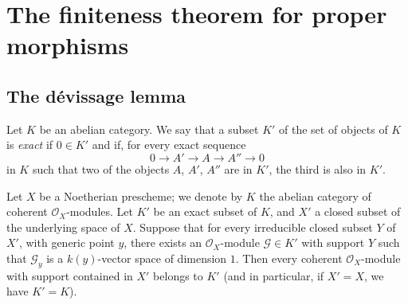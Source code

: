 \section{The finiteness theorem for proper morphisms}
\label{section:III.3}

\subsection{The dévissage lemma}
\label{subsection:III.3.1}

\begin{definition}[3.1.1]
\label{III.3.1.1}
Let $K$ be an abelian category. We say that a subset $K'$ of
the set of objects of $K$ is \emph{exact} if $0\in K'$ and if, for every
exact sequence
\[
0\longrightarrow A'\longrightarrow A\longrightarrow A''\longrightarrow0
\]
in $K$ such that two of the objects $A$, $A'$, $A''$ are in $K'$, the
third is also in $K'$.
\end{definition}

\begin{theorem}[3.1.2]
\label{III.3.1.2}
Let $X$ be a Noetherian prescheme; we denote by $K$ the abelian category
of coherent $\mathcal O_X$-modules. Let $K'$ be an exact subset of
$K$, and $X'$ a closed subset of the underlying space of $X$. Suppose that
for every irreducible closed subset $Y$ of $X'$, with generic point $y$, there
exists an $\mathcal O_X$-module $\mathcal G\in K'$ with support $Y$ such that $\mathcal G_y$ is
a $k(y)$-vector space of dimension $1$. Then every coherent $\mathcal O_X$-module
with support contained in $X'$ belongs to $K'$ (and in particular,
if $X'=X$, we have $K'=K$).
\end{theorem}

